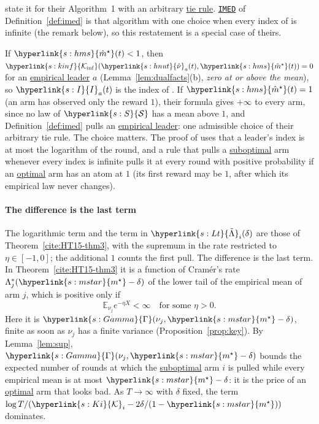 \documentclass[11pt]{article}
\newcommand{\E}{\mathbb{E}}
\newcommand{\sy}[2]{{\hyperlink{#1}{#2}}}
\newcommand{\term}[2]{\hyperlink{#1}{#2}}
\newcommand{\imed}{\hyperref[alg:imed]{\texttt{IMED}}}
\newcommand{\Sm}{\sy{s:S}{\mathcal{S}}}
\newcommand{\ms}{\sy{s:mstar}{m^{\star}}}
\newcommand{\Kinf}{\sy{s:kinf}{\mathcal{K}_{\inf}}}
\newcommand{\hnut}{\sy{s:hnut}{\hat{\nu}}}
\newcommand{\hms}{\sy{s:hms}{\hat{m}^{\star}}}
\newcommand{\Ix}{\sy{s:I}{I}}
\newcommand{\Gam}{\sy{s:Gamma}{\Gamma}}
\newcommand{\Lt}{\sy{s:Lt}{\tilde{\Lambda}}}
\newcommand{\Ki}{\sy{s:Ki}{\mathcal{K}}}
\begin{document}
\citet{HT15} state it for their Algorithm~1 with an arbitrary \term{w:tie}{tie rule}. \imed{} of
Definition~\ref{def:imed} is that algorithm with one choice when every index of
\citet[Algorithm~1]{HT15} is infinite (the remark below), so this restatement is a special
case of theirs.

\begin{remark}
If $\hms(t)<1$, then $\Kinf(\hnut_a(t),\hms(t))=0$ for an \term{w:leader}{empirical leader} $a$
(Lemma~\ref{lem:dualfacts}(b), \emph{zero at or above the mean}), so $\Ix_a(t)$ is the index of
\citet[Algorithm~1]{HT15}. If $\hms(t)=1$ (an arm has observed only the reward $1$), their
formula gives $+\infty$ to every arm, since no law of $\Sm$ has a mean above $1$, and
Definition~\ref{def:imed} pulls an \term{w:leader}{empirical leader}: one admissible choice of their arbitrary tie
rule. The choice matters. The proof of \citet[Theorem~3]{HT15} uses that a leader's index is at most
the logarithm of the round, and a rule that pulls a \term{w:subopt}{suboptimal} arm whenever every index is infinite
pulls it at every round with positive probability if an \term{w:optimal}{optimal} arm has an atom at $1$ (its first
reward may be $1$, after which its empirical law never changes).
\end{remark}

\paragraph{The difference is the last term} The logarithmic term and the term
in $\Lt_i(\delta)$ are those of Theorem~\ref{cite:HT15-thm3}, with the supremum in the rate restricted
to $\eta\in[-1,0]$; the additional $1$ counts the first pull. The difference is the last term. In
Theorem~\ref{cite:HT15-thm3} it is a function of Cram\'er's rate $\Lambda_j^*(\ms-\delta)$ of the lower
tail of the empirical mean of arm $j$, which is positive only if
\begin{equation*}
  \E_{\nu_j}e^{-\eta X}<\infty\quad\text{for some }\eta>0.
\end{equation*}
Here it is $\Gam(\nu_j,\ms-\delta)$, finite as soon as $\nu_j$ has a finite variance
(Proposition~\ref{prop:key}). By Lemma~\ref{lem:sup}, $\Gam(\nu_j,\ms-\delta)$ bounds the expected
number of rounds at which the \term{w:subopt}{suboptimal} arm $i$ is pulled while every empirical mean is at most
$\ms-\delta$: it is the price of an \term{w:optimal}{optimal} arm that looks bad. As $T\to\infty$ with $\delta$ fixed, the
term $\log T/(\Ki_i-2\delta/(1-\ms))$ dominates.
\end{document}
